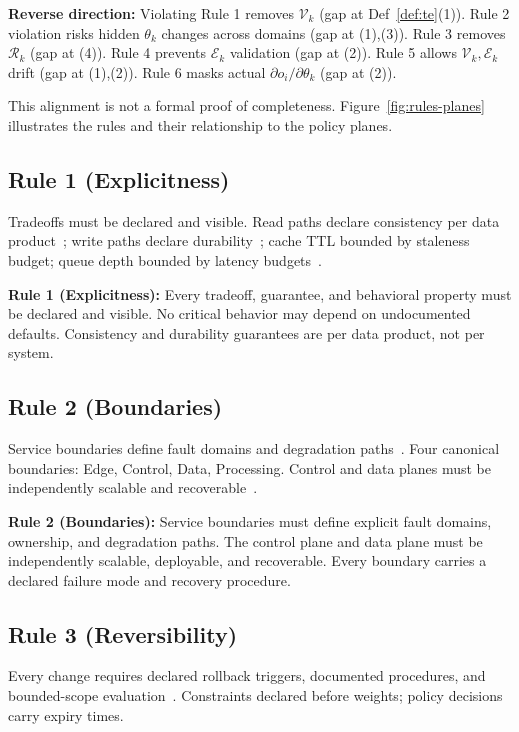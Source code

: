 \documentclass[conference]{IEEEtran}
\begin{document}
\textbf{Reverse direction:} Violating Rule 1 removes $\mathcal{V}_k$ (gap at Def~\ref{def:te}(1)). Rule 2 violation risks hidden $\theta_k$ changes across domains (gap at (1),(3)). Rule 3 removes $\mathcal{R}_k$ (gap at (4)). Rule 4 prevents $\mathcal{E}_k$ validation (gap at (2)). Rule 5 allows $\mathcal{V}_k,\mathcal{E}_k$ drift (gap at (1),(2)). Rule 6 masks actual $\partial o_i/\partial \theta_k$ (gap at (2)).


This alignment is not a formal proof of completeness. Figure~\ref{fig:rules-planes} illustrates the rules and their relationship to the policy planes.


\subsection{Rule 1 (Explicitness)}
Tradeoffs must be declared and visible. Read paths declare consistency per data product~\cite{dynamo}; write paths declare durability~\cite{raft}; cache TTL bounded by staleness budget; queue depth bounded by latency budgets~\cite{kafka}.

\noindent\textbf{Rule 1 (Explicitness):} Every tradeoff, guarantee, and behavioral property must be declared and visible. No critical behavior may depend on undocumented defaults. Consistency and durability guarantees are per data product, not per system.


\subsection{Rule 2 (Boundaries)}
Service boundaries define fault domains and degradation paths~\cite{parnas1972criteria}. Four canonical boundaries: Edge, Control, Data, Processing. Control and data planes must be independently scalable and recoverable~\cite{bigtable}.

\noindent\textbf{Rule 2 (Boundaries):} Service boundaries must define explicit fault domains, ownership, and degradation paths. The control plane and data plane must be independently scalable, deployable, and recoverable. Every boundary carries a declared failure mode and recovery procedure.


\subsection{Rule 3 (Reversibility)}
Every change requires declared rollback triggers, documented procedures, and bounded-scope evaluation~\cite{sre}. Constraints declared before weights; policy decisions carry expiry times.
\end{document}
